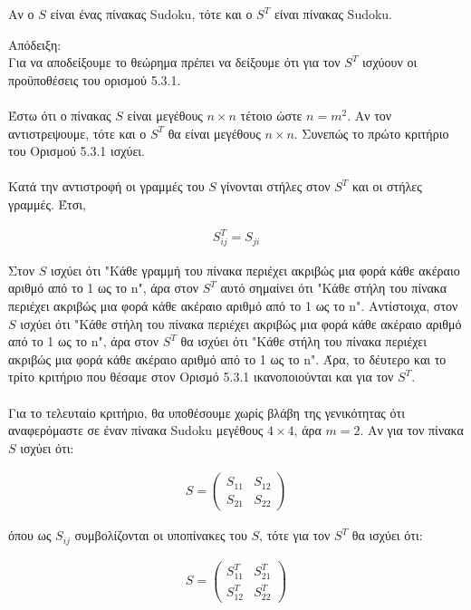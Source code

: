 \documentclass[oneside,12pt]{book}
\theoremstyle{definition}
\begin{document}
\begin{theorem}{}{}
	Αν ο \(S\) είναι ένας πίνακας Sudoku, τότε και ο \(S^{T}\) είναι πίνακας Sudoku.
\end{theorem}

Απόδειξη: \\
Για να αποδείξουμε το θεώρημα πρέπει να δείξουμε ότι για τον \(S^{T}\) ισχύουν οι προϋποθέσεις του ορισμού 5.3.1. \\ \\

Έστω ότι ο πίνακας \(S\) είναι μεγέθους \(n \times n\) τέτοιο ώστε \(n = m^2\). Αν τον αντιστρεψουμε, τότε και ο \(S^{T}\) θα είναι μεγέθους \(n \times n\). Συνεπώς το πρώτο κριτήριο του Ορισμού 5.3.1 ισχύει. \\ \\

Κατά την αντιστροφή οι γραμμές του \(S\) γίνονται στήλες στον \(S^{T}\) και οι στήλες γραμμές. Έτσι,

\begin{align*}
	S^{T}_{ij} = S_{ji}
\end{align*}

Στον \(S\) ισχύει ότι "Κάθε γραμμή του πίνακα περιέχει ακριβώς μια φορά κάθε ακέραιο αριθμό από το 1 ως το n", άρα στον \(S^{T}\) αυτό σημαίνει ότι "Κάθε στήλη του πίνακα περιέχει ακριβώς μια φορά κάθε ακέραιο αριθμό από το 1 ως το n". Αντίστοιχα, στον \(S\) ισχύει ότι "Κάθε στήλη του πίνακα περιέχει ακριβώς μια φορά κάθε ακέραιο αριθμό από το 1 ως το n", άρα στον \(S^{T}\) θα ισχύει ότι "Κάθε στήλη του πίνακα περιέχει ακριβώς μια φορά κάθε ακέραιο αριθμό από το 1 ως το n". Άρα, το δέυτερο και το τρίτο κριτήριο που θέσαμε στον Ορισμό 5.3.1 ικανοποιούνται και για τον \(S^{T}\). \\ \\

Για το τελευταίο κριτήριο, θα υποθέσουμε χωρίς βλάβη της γενικότητας ότι αναφερόμαστε σε έναν πίνακα Sudoku μεγέθους \(4 \times 4\), άρα \(m = 2\). Αν για τον πίνακα \(S\) ισχύει ότι:

\begin{align*}
	S = \begin{pmatrix}
		S_{11} & S_{12} \\
		S_{21} & S_{22}
	\end{pmatrix}
\end{align*}

όπου ως \(S_{ij}\) συμβολίζονται οι υποπίνακες του \(S\), τότε για τον \(S^{T}\) θα ισχύει ότι:

\begin{align*}
	S = \begin{pmatrix}
		S_{11}^{T} & S_{21}^{T} \\
		S_{12}^{T} & S_{22}^{T}
	\end{pmatrix}
\end{align*}
\end{document}
